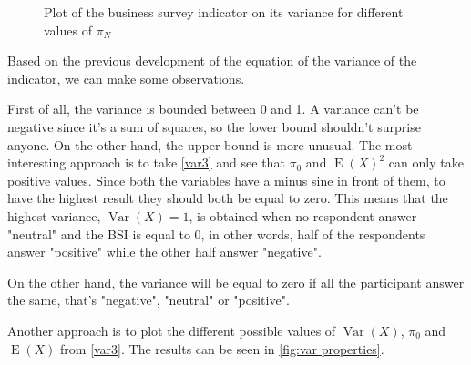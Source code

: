 \documentclass[12pt,a4paper,oneside]{book}
\DeclareMathOperator{\Var}{Var}
\DeclareMathOperator{\E}{E}
\begin{document}
\begin{figure}[hbt!]
    \caption{Plot of the business survey indicator on its variance for different values of $\pi_N$}
    \label{fig:var properties}
\end{figure}


Based on the previous development of the equation of the variance of the indicator, we can make some observations.

First of all, the variance is bounded between 0 and 1. 
A variance can't be negative since it's a sum of squares, so the lower bound shouldn't surprise anyone. On the other hand, the upper bound is more unusual. The most interesting approach is to take  \autoref{var3} and see that $\pi_0$ and $\E(X)^2$ can only take positive values. Since both the variables have a minus sine in front of them, to have the highest result they should both be equal to zero. 
This means that the highest variance, $\Var(X)=1$, is obtained when no respondent answer "neutral" and the BSI is equal to 0, in other words, half of the respondents answer "positive" while the other half answer "negative". 

On the other hand, the variance will be equal to zero if all the participant answer the same, that's "negative", "neutral" or "positive".

Another approach is to plot the different possible values of $\Var(X)$, $\pi_0$ and $\E(X)$ from \autoref{var3}. The results can be seen in \autoref{fig:var properties}.
\end{document}
